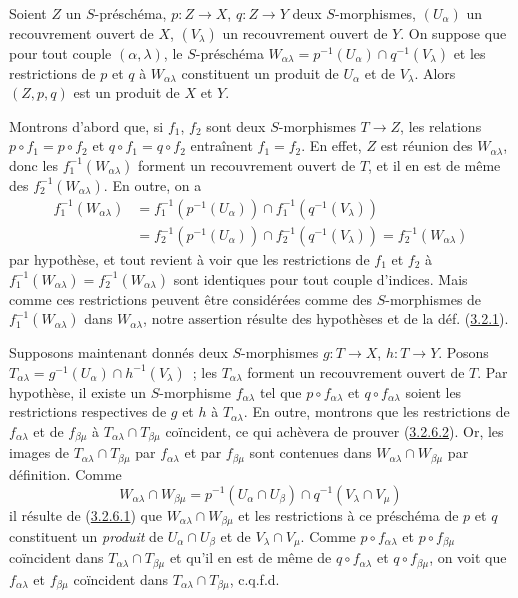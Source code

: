\begin{lemma}[3.2.6.2]
\label{I.3.2.6.2-fr}
Soient $Z$ un $S$-préschéma, $p:Z\to X$, $q:Z\to Y$ deux $S$-morphismes,
$(U_\alpha)$ un recouvrement ouvert de $X$, $(V_\lambda)$ un recouvrement
ouvert de $Y$. On suppose que pour tout couple $(\alpha,\lambda)$, le
$S$-préschéma
$W_{\alpha\lambda}=p^{-1}(U_\alpha)\cap q^{-1}(V_\lambda)$ et les
restrictions de $p$ et $q$ à $W_{\alpha\lambda}$ constituent un produit de
$U_\alpha$ et de $V_\lambda$. Alors $(Z,p,q)$ est un produit de $X$ et $Y$.
\end{lemma}

Montrons d'abord que, si $f_1$, $f_2$ sont deux $S$-morphismes $T\to Z$, les
relations $p\circ f_1=p\circ f_2$ et $q\circ f_1=q\circ f_2$ entraînent
$f_1=f_2$. En effet, $Z$ est réunion des $W_{\alpha\lambda}$, donc les
$f_1^{-1}(W_{\alpha\lambda})$ forment un recouvrement ouvert de $T$, et il
en est de même des $f_2^{-1}(W_{\alpha\lambda})$. En outre, on a
\[
\begin{aligned}
  f_1^{-1}(W_{\alpha\lambda})
  &=f_1^{-1}(p^{-1}(U_\alpha))\cap
    f_1^{-1}(q^{-1}(V_\lambda)) \\
  &=f_2^{-1}(p^{-1}(U_\alpha))\cap
    f_2^{-1}(q^{-1}(V_\lambda))
   =f_2^{-1}(W_{\alpha\lambda})
\end{aligned}
\]
par hypothèse, et tout revient à voir que les restrictions de $f_1$ et $f_2$
à $f_1^{-1}(W_{\alpha\lambda})=f_2^{-1}(W_{\alpha\lambda})$ sont
identiques pour tout couple d'indices. Mais comme ces restrictions peuvent
être considérées comme des $S$-morphismes de
$f_1^{-1}(W_{\alpha\lambda})$ dans $W_{\alpha\lambda}$, notre assertion
résulte des hypothèses et de la déf. (\hyperref[I.3.2.1-fr]{3.2.1}).

Supposons maintenant donnés deux $S$-morphismes $g:T\to X$, $h:T\to Y$.
Posons
$T_{\alpha\lambda}=g^{-1}(U_\alpha)\cap h^{-1}(V_\lambda)$~; les
$T_{\alpha\lambda}$ forment un recouvrement ouvert de $T$. Par hypothèse,
il existe un $S$-morphisme $f_{\alpha\lambda}$ tel que
$p\circ f_{\alpha\lambda}$ et $q\circ f_{\alpha\lambda}$ soient les
restrictions respectives de $g$ et $h$ à $T_{\alpha\lambda}$. En outre,
montrons que les restrictions de $f_{\alpha\lambda}$ et de
$f_{\beta\mu}$ à
$T_{\alpha\lambda}\cap T_{\beta\mu}$ coïncident, ce qui achèvera de
prouver (\hyperref[I.3.2.6.2-fr]{3.2.6.2}). Or, les images de
$T_{\alpha\lambda}\cap T_{\beta\mu}$ par $f_{\alpha\lambda}$ et par
$f_{\beta\mu}$ sont contenues dans
$W_{\alpha\lambda}\cap W_{\beta\mu}$ par définition. Comme
\[
  W_{\alpha\lambda}\cap W_{\beta\mu}
  =p^{-1}(U_\alpha\cap U_\beta)\cap
   q^{-1}(V_\lambda\cap V_\mu)
\]
il résulte de (\hyperref[I.3.2.6.1-fr]{3.2.6.1}) que
$W_{\alpha\lambda}\cap W_{\beta\mu}$ et les restrictions à ce préschéma
de $p$ et $q$ constituent un \emph{produit} de
$U_\alpha\cap U_\beta$ et de $V_\lambda\cap V_\mu$. Comme
$p\circ f_{\alpha\lambda}$ et $p\circ f_{\beta\mu}$ coïncident dans
$T_{\alpha\lambda}\cap T_{\beta\mu}$ et qu'il en est de même de
$q\circ f_{\alpha\lambda}$ et $q\circ f_{\beta\mu}$, on voit que
$f_{\alpha\lambda}$ et $f_{\beta\mu}$ coïncident dans
$T_{\alpha\lambda}\cap T_{\beta\mu}$, c.q.f.d.

